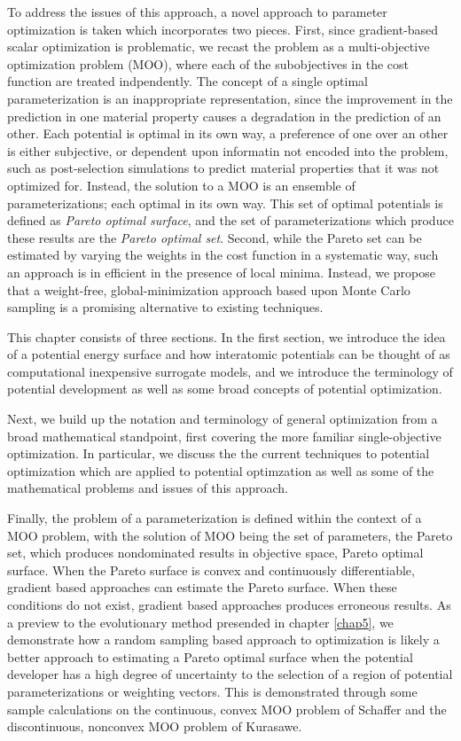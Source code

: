To address the issues of this approach, a novel approach to parameter optimization is taken which incorporates two pieces.  First, since gradient-based scalar optimization is problematic, we recast the problem as a multi-objective optimization problem (MOO), where each of the subobjectives in the cost function are treated indpendently.  The concept of a single optimal parameterization is an inappropriate representation, since the improvement in the prediction in one material property causes a degradation in the prediction of an other.  Each potential is optimal in its own way, a preference of one over an other is either subjective, or dependent upon informatin not encoded into the problem, such as post-selection simulations to predict material properties that it was not optimized for.  Instead, the solution to a MOO is an ensemble of parameterizations; each optimal in its own way.  This set of optimal potentials is defined as \emph{Pareto optimal surface}, and the set of parameterizations which produce these results are the \emph{Pareto optimal set}.  Second, while the Pareto set can be estimated by varying the weights in the cost function in a systematic way, such an approach is in efficient in the presence of local minima.  Instead, we propose that a weight-free, global-minimization approach based upon Monte Carlo sampling is a promising alternative to existing techniques.

This chapter consists of three sections.  In the first section, we introduce the idea of a potential energy surface and how interatomic potentials can be thought of as computational inexpensive surrogate models, and we introduce the terminology of potential development as well as some broad concepts of potential optimization.

Next, we build up the notation and terminology of general optimization from a broad mathematical standpoint, first covering the more familiar single-objective optimization.  In particular, we discuss the the current techniques to potential optimization which are applied to potential optimzation as well as some of the mathematical problems and issues of this approach.

Finally, the problem of a parameterization is defined within the context of a MOO problem, with the solution of MOO being the set of parameters, the Pareto set, which produces nondominated results in objective space, Pareto optimal surface.  When the Pareto surface is convex and continuously differentiable, gradient based approaches can estimate the Pareto surface.  When these conditions do not exist, gradient based approaches produces erroneous results.  As a preview to the evolutionary method presended in chapter \ref{chap5}, we demonstrate how a random sampling based approach to optimization is likely a better approach to estimating a Pareto optimal surface when the potential developer has a high degree of uncertainty to the selection of a region of potential parameterizations or weighting vectors.  This is demonstrated through some sample calculations on the continuous, convex MOO  problem of Schaffer\cite{schaffer1984_pareto} and the discontinuous, nonconvex MOO problem of Kurasawe\cite{kursawe1991_pareto}.

